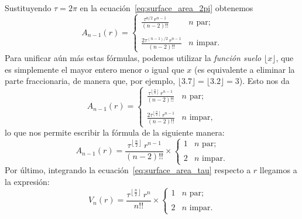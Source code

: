 Sustituyendo $\tau=2\pi$ en la ecuación~\eqref{eq:surface_area_2pi} obtenemos
\[
A_{n-1}(r) = \begin{cases}
\displaystyle \frac{\tau^{n/2}\,r^{n-1}}{(n-2)!!} & n \text{ par}; \\ \\
\displaystyle \frac{2\tau^{(n-1)/2}\,r^{n-1}}{(n-2)!!} & n \text{ impar}.
\end{cases} \]
Para unificar aún más estas fórmulas, podemos utilizar la \emph{función suelo} $\lfloor x \rfloor$, que es simplemente el mayor entero menor o igual que $x$ (es equivalente a eliminar la parte fraccionaria, de manera que, por ejemplo, $\lfloor 3.7 \rfloor = \lfloor 3.2 \rfloor = 3$). Esto nos da
\[ A_{n-1}(r) = \begin{cases}
 \displaystyle \frac{\tau^{\left\lfloor \frac{n}{2} \right\rfloor}\,r^{n-1}}{(n-2)!!} & n \text{ par}; \\ \\
 \displaystyle \frac{2\tau^{\left\lfloor \frac{n}{2} \right\rfloor}\,r^{n-1}}{(n-2)!!} & n \text{ impar},
 \end{cases} \]
lo que nos permite escribir la fórmula de la siguiente manera:
\begin{equation}
\label{eq:surface_area_tau}
A_{n-1}(r) = \frac{\tau^{\left\lfloor \frac{n}{2} \right\rfloor}\,r^{n-1}}{(n-2)!!}\times \begin{cases}
1 & n \text{ par}; \\ \\
2 & n \text{ impar}.
\end{cases}
\end{equation}
Por último, integrando la ecuación~\eqref{eq:surface_area_tau} respecto a $r$ llegamos a la expresión:
\begin{equation}
\label{eq:volume_tau}
V_n(r) = \frac{\tau^{\left\lfloor \frac{n}{2} \right\rfloor}\,r^n}{n!!}\times \begin{cases}
1 & n \text{ par}; \\ \\
2 & n \text{ impar}.
\end{cases}
\end{equation}

